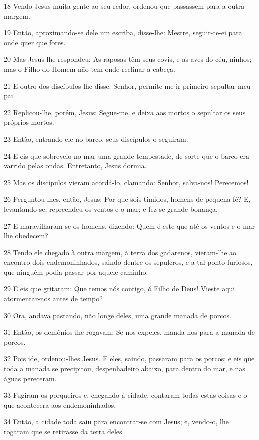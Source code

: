 \par 18 Vendo Jesus muita gente ao seu redor, ordenou que passassem para a outra margem.
\par 19 Então, aproximando-se dele um escriba, disse-lhe: Mestre, seguir-te-ei para onde quer que fores.
\par 20 Mas Jesus lhe respondeu: As raposas têm seus covis, e as aves do céu, ninhos; mas o Filho do Homem não tem onde reclinar a cabeça.
\par 21 E outro dos discípulos lhe disse: Senhor, permite-me ir primeiro sepultar meu pai.
\par 22 Replicou-lhe, porém, Jesus: Segue-me, e deixa aos mortos o sepultar os seus próprios mortos.
\par 23 Então, entrando ele no barco, seus discípulos o seguiram.
\par 24 E eis que sobreveio no mar uma grande tempestade, de sorte que o barco era varrido pelas ondas. Entretanto, Jesus dormia.
\par 25 Mas os discípulos vieram acordá-lo, clamando: Senhor, salva-nos! Perecemos!
\par 26 Perguntou-lhes, então, Jesus: Por que sois tímidos, homens de pequena fé? E, levantando-se, repreendeu os ventos e o mar; e fez-se grande bonança.
\par 27 E maravilharam-se os homens, dizendo: Quem é este que até os ventos e o mar lhe obedecem?
\par 28 Tendo ele chegado à outra margem, à terra dos gadarenos, vieram-lhe ao encontro dois endemoninhados, saindo dentre os sepulcros, e a tal ponto furiosos, que ninguém podia passar por aquele caminho.
\par 29 E eis que gritaram: Que temos nós contigo, ó Filho de Deus! Vieste aqui atormentar-nos antes de tempo?
\par 30 Ora, andava pastando, não longe deles, uma grande manada de porcos.
\par 31 Então, os demônios lhe rogavam: Se nos expeles, manda-nos para a manada de porcos.
\par 32 Pois ide, ordenou-lhes Jesus. E eles, saindo, passaram para os porcos; e eis que toda a manada se precipitou, despenhadeiro abaixo, para dentro do mar, e nas águas pereceram.
\par 33 Fugiram os porqueiros e, chegando à cidade, contaram todas estas coisas e o que acontecera aos endemoninhados.
\par 34 Então, a cidade toda saiu para encontrar-se com Jesus; e, vendo-o, lhe rogaram que se retirasse da terra deles.

